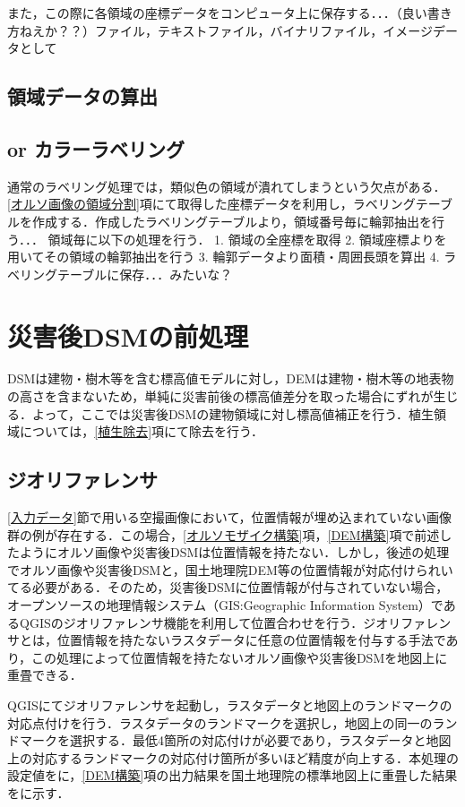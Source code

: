       また，この際に各領域の座標データをコンピュータ上に保存する．．．（良い書き方ねえか？？）ファイル，テキストファイル，バイナリファイル，イメージデータとして

    \subsection{領域データの算出}
    \subsection{or カラーラベリング}
      通常のラベリング処理では，類似色の領域が潰れてしまうという欠点がある．
      \ref{オルソ画像の領域分割}項にて取得した座標データを利用し，ラベリングテーブルを作成する．作成したラベリングテーブルより，領域番号毎に輪郭抽出を行う．．．
      領域毎に以下の処理を行う．
        1. 領域の全座標を取得
        2. 領域座標よりを用いてその領域の輪郭抽出を行う
        3. 輪郭データより面積・周囲長頭を算出
        4. ラベリングテーブルに保存．．．みたいな？
      


  \section{災害後DSMの前処理}
    DSMは建物・樹木等を含む標高値モデルに対し，DEMは建物・樹木等の地表物の高さを含まないため，単純に災害前後の標高値差分を取った場合にずれが生じる．よって，ここでは災害後DSMの建物領域に対し標高値補正を行う．植生領域については，\ref{植生除去}項にて除去を行う．

    \subsection{ジオリファレンサ}
      \ref{入力データ}節で用いる空撮画像において，位置情報が埋め込まれていない画像群の例が存在する．この場合，\ref{オルソモザイク構築}項，\ref{DEM構築}項で前述したようにオルソ画像や災害後DSMは位置情報を持たない．しかし，後述の処理でオルソ画像や災害後DSMと，国土地理院DEM等の位置情報が対応付けられいてる必要がある．そのため，災害後DSMに位置情報が付与されていない場合，オープンソースの地理情報システム（GIS:Geographic Information System）であるQGIS\cite{QGIS}のジオリファレンサ機能を利用して位置合わせを行う．ジオリファレンサとは，位置情報を持たないラスタデータに任意の位置情報を付与する手法であり，この処理によって位置情報を持たないオルソ画像や災害後DSMを地図上に重畳できる．

      QGISにてジオリファレンサを起動し，ラスタデータと地図上のランドマークの対応点付けを行う．ラスタデータのランドマークを選択し，地図上の同一のランドマークを選択する．最低4箇所の対応付けが必要であり，ラスタデータと地図上の対応するランドマークの対応付け箇所が多いほど精度が向上する．本処理の設定値を\fref{}に，\ref{DEM構築}項の出力結果を国土地理院の標準地図\cite{標準地図}上に重畳した結果を\fref{}に示す．

